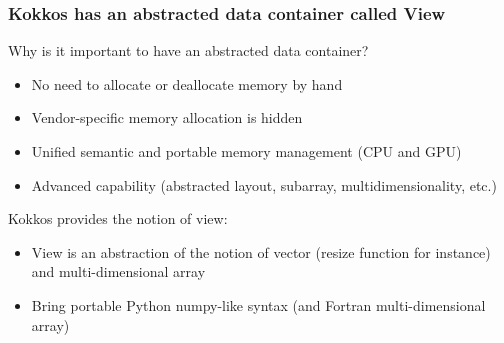 \documentclass[aspectratio=169]{beamer}
\begin{document}

\begin{frame}[fragile]
    \frametitle{Kokkos has an abstracted data container called View} 

Why is it important to have an abstracted data container?

\begin{itemize}
    \item No need to allocate or deallocate memory by hand
    \item Vendor-specific memory allocation is hidden
    \item Unified semantic and portable memory management (CPU and GPU)
    \item Advanced capability (abstracted layout, subarray, multidimensionality, etc.)
\end{itemize}

Kokkos provides the notion of view:

\begin{itemize}
    \item View is an abstraction of the notion of vector (resize function for instance) and multi-dimensional array
    \item Bring portable Python numpy-like syntax (and Fortran multi-dimensional array)
\end{itemize}

\end{frame}

\end{document}
